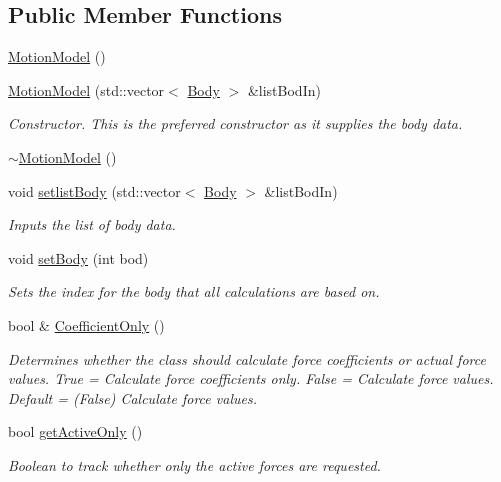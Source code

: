 \subsection*{Public Member Functions}
\begin{DoxyCompactItemize}
\item 
\hyperlink{classosea_1_1ofreq_1_1_motion_model_a5a5e4bba0f6ca24e1fdd316458f4f824}{Motion\-Model} ()
\item 
\hyperlink{classosea_1_1ofreq_1_1_motion_model_aace42c5711b5486181e986add9a72b8f}{Motion\-Model} (std\-::vector$<$ \hyperlink{classosea_1_1ofreq_1_1_body}{Body} $>$ \&list\-Bod\-In)
\begin{DoxyCompactList}\small\item\em Constructor. This is the preferred constructor as it supplies the body data. \end{DoxyCompactList}\item 
\hyperlink{classosea_1_1ofreq_1_1_motion_model_ac48a359c77d9efe39d4ec8c9e862a1cd}{$\sim$\-Motion\-Model} ()
\item 
void \hyperlink{classosea_1_1ofreq_1_1_motion_model_a92f6b9639a82aef868dbaf8445276d3c}{setlist\-Body} (std\-::vector$<$ \hyperlink{classosea_1_1ofreq_1_1_body}{Body} $>$ \&list\-Bod\-In)
\begin{DoxyCompactList}\small\item\em Inputs the list of body data. \end{DoxyCompactList}\item 
void \hyperlink{classosea_1_1ofreq_1_1_motion_model_a713b903a3e78141fff2af9c045755ffb}{set\-Body} (int bod)
\begin{DoxyCompactList}\small\item\em Sets the index for the body that all calculations are based on. \end{DoxyCompactList}\item 
bool \& \hyperlink{classosea_1_1ofreq_1_1_motion_model_af4d34bfa133e77f1527cee1aa36b02f4}{Coefficient\-Only} ()
\begin{DoxyCompactList}\small\item\em Determines whether the class should calculate force coefficients or actual force values. True = Calculate force coefficients only. False = Calculate force values. Default = (False) Calculate force values. \end{DoxyCompactList}\item 
bool \hyperlink{classosea_1_1ofreq_1_1_motion_model_afc54a14912e56315505ef5dbec28bd39}{get\-Active\-Only} ()
\begin{DoxyCompactList}\small\item\em Boolean to track whether only the active forces are requested. \end{DoxyCompactList}\item 

\end{DoxyCompactItemize}
